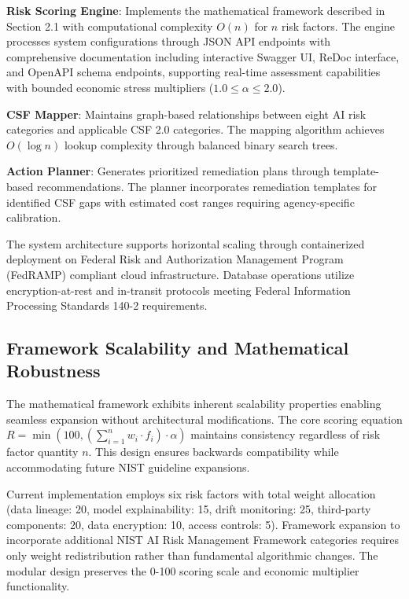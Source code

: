 \documentclass[11pt,letterpaper]{article}
\begin{document}
\textbf{Risk Scoring Engine}: Implements the mathematical framework described in Section 2.1 with computational complexity $O(n)$ for $n$ risk factors. The engine processes system configurations through JSON API endpoints with comprehensive documentation including interactive Swagger UI, ReDoc interface, and OpenAPI schema endpoints, supporting real-time assessment capabilities with bounded economic stress multipliers ($1.0 \leq \alpha \leq 2.0$).

\textbf{CSF Mapper}: Maintains graph-based relationships between eight AI risk categories and applicable CSF 2.0 categories. The mapping algorithm achieves $O(\log n)$ lookup complexity through balanced binary search trees.

\textbf{Action Planner}: Generates prioritized remediation plans through template-based recommendations. The planner incorporates remediation templates for identified CSF gaps with estimated cost ranges requiring agency-specific calibration.

The system architecture supports horizontal scaling through containerized deployment on Federal Risk and Authorization Management Program (FedRAMP) compliant cloud infrastructure. Database operations utilize encryption-at-rest and in-transit protocols meeting Federal Information Processing Standards 140-2 requirements.

\subsection{Framework Scalability and Mathematical Robustness}

The mathematical framework exhibits inherent scalability properties enabling seamless expansion without architectural modifications. The core scoring equation $R = \min(100, (\sum_{i=1}^{n} w_i \cdot f_i) \cdot \alpha)$ maintains consistency regardless of risk factor quantity $n$. This design ensures backwards compatibility while accommodating future NIST guideline expansions.

Current implementation employs six risk factors with total weight allocation (data lineage: 20, model explainability: 15, drift monitoring: 25, third-party components: 20, data encryption: 10, access controls: 5). Framework expansion to incorporate additional NIST AI Risk Management Framework categories requires only weight redistribution rather than fundamental algorithmic changes. The modular design preserves the 0-100 scoring scale and economic multiplier functionality.
\end{document}
